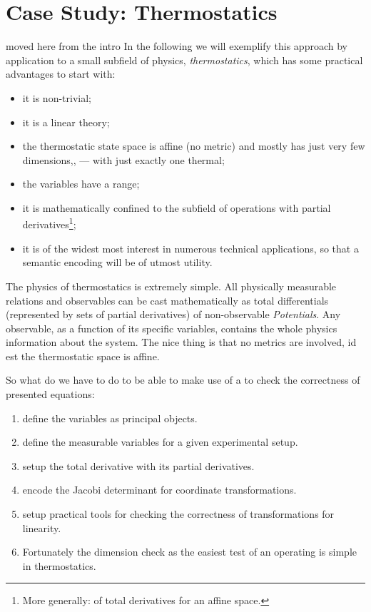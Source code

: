 \section{Case Study: Thermostatics}

\begin{newpart}{moved here from the intro}
  In the following we will exemplify this approach by application to a small subfield of
physics, {\emph{thermostatics}}, which has some practical advantages to start with:
\begin{itemize}
\item it is non-trivial;
\item it is a linear theory;
\item the thermostatic state space is affine (no metric) and mostly has just very few
  dimensions,, --- with just exactly one thermal;
\item the variables have a range;
\item it is mathematically confined to the subfield of operations with partial
  derivatives\footnote{More generally: of total derivatives for an affine space.};
\item it is of the widest most interest in numerous technical applications, so that a
  semantic encoding will be of utmost utility.
\end{itemize}
\end{newpart}
The physics of thermostatics is extremely simple.  All physically measurable relations and
observables can be cast mathematically as total differentials (represented by sets of
partial derivatives) of non-observable {\emph{Potentials}}.  Any observable, as a function
of its specific variables, contains the whole physics information about the system.  The
nice thing is that no metrics are involved, id est the thermostatic space is affine.

So what do we have to do to be able to make use of a {\physml} to check the
correctness of presented equations: 
\begin{enumerate}
\item define the variables as principal objects.
\item define the measurable variables for a given experimental setup.
\item setup the total derivative with its partial derivatives.
\item encode the Jacobi determinant for coordinate transformations.
\item setup practical tools for checking the correctness of transformations for linearity.
\item Fortunately the dimension check as the easiest test of an operating {\physml} is simple in
  thermostatics.
\end{enumerate}

